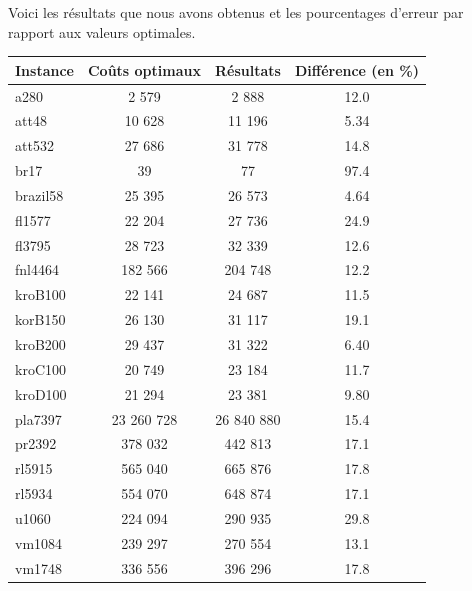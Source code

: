 \documentclass{article}
\begin{document}
Voici les résultats que nous avons obtenus et les pourcentages d'erreur par rapport aux valeurs optimales.
\begin{center}
\begin{tabular}{|l|c|c|c|}
\hline
Instance & Coûts optimaux & Résultats & Différence (en \%)\\
\hline
a280 & 2 579 & 2 888 & 12.0\\
\hline
att48 & 10 628 & 11 196 & 5.34\\
\hline
att532 & 27 686 & 31 778 & 14.8\\
\hline
br17 & 39 & 77 & 97.4\\
\hline
brazil58 & 25 395 & 26 573 & 4.64\\
\hline
fl1577 & 22 204 & 27 736 & 24.9\\
\hline
fl3795 & 28 723 & 32 339 & 12.6\\
\hline
fnl4464 & 182 566 & 204 748 & 12.2\\
\hline
kroB100 & 22 141 & 24 687 & 11.5\\
\hline
korB150 & 26 130 & 31 117 & 19.1\\
\hline
kroB200 & 29 437 & 31 322 & 6.40\\
\hline
kroC100 & 20 749 & 23 184 & 11.7\\
\hline
kroD100 & 21 294 & 23 381 & 9.80\\
\hline
pla7397 & 23 260 728 & 26 840 880 & 15.4\\
\hline
pr2392 & 378 032 & 442 813 & 17.1\\
\hline
rl5915 & 565 040 & 665 876 & 17.8\\
\hline
rl5934 & 554 070 & 648 874 & 17.1\\
\hline
u1060 & 224 094 & 290 935 & 29.8\\
\hline
vm1084 & 239 297 & 270 554 & 13.1\\
\hline
vm1748 & 336 556 & 396 296 & 17.8\\
\hline
\end{tabular}
\end{center}
\end{document}
